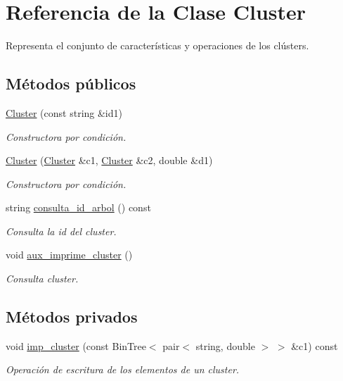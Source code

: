 \hypertarget{class_cluster}{}\section{Referencia de la Clase Cluster}
\label{class_cluster}


Representa el conjunto de características y operaciones de los clústers.  


\subsection*{Métodos públicos}
\begin{DoxyCompactItemize}
\item 
\hyperlink{class_cluster_ac7675689117c001824a50015bfc5e53c}{Cluster} (const string \&id1)
\begin{DoxyCompactList}\small\item\em Constructora por condición. \end{DoxyCompactList}\item 
\hyperlink{class_cluster_a7b6be460914bfb667992aa8858aaee57}{Cluster} (\hyperlink{class_cluster}{Cluster} \&c1, \hyperlink{class_cluster}{Cluster} \&c2, double \&d1)
\begin{DoxyCompactList}\small\item\em Constructora por condición. \end{DoxyCompactList}\item 
string \hyperlink{class_cluster_a2e994baf889c15dbb0e6111070c08d5d}{consulta\+\_\+id\+\_\+arbol} () const
\begin{DoxyCompactList}\small\item\em Consulta la id del cluster. \end{DoxyCompactList}\item 
void \hyperlink{class_cluster_a07f366fa03061135057b1378d8b25777}{aux\+\_\+imprime\+\_\+cluster} ()
\begin{DoxyCompactList}\small\item\em Consulta cluster. \end{DoxyCompactList}\end{DoxyCompactItemize}
\subsection*{Métodos privados}
\begin{DoxyCompactItemize}
\item 
void \hyperlink{class_cluster_a25c0220fbad15328b30df8f9cf0c845a}{imp\+\_\+cluster} (const Bin\+Tree$<$ pair$<$ string, double $>$ $>$ \&c1) const
\begin{DoxyCompactList}\small\item\em Operación de escritura de los elementos de un cluster. \end{DoxyCompactList}\end{DoxyCompactItemize}
